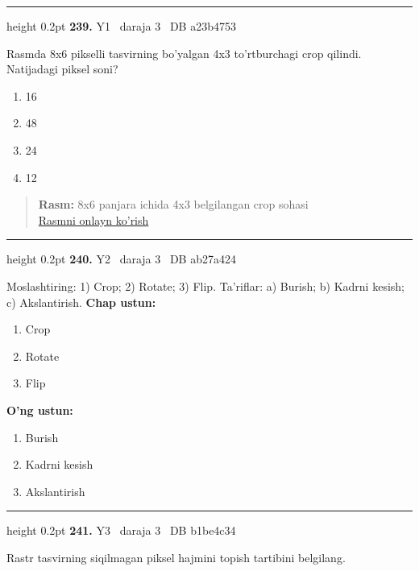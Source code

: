 \documentclass[10pt,a4paper,oneside]{article}
\begin{document}
\vspace{2mm}\hrule height 0.2pt \vspace{4mm}
\hypertarget{q239}{\textbf{\color{ink}239.}}  {\color{muted}\scriptsize Y1 \textbullet\ daraja 3 \textbullet\ DB a23b4753}
\par
Rasmda 8x6 pikselli tasvirning bo'yalgan 4x3 to'rtburchagi crop qilindi. Natijadagi piksel soni?
\begin{enumerate}[label=\Alph*),leftmargin=9mm]
\item 16
\item 48
\item 24
\item 12
\end{enumerate}
\begin{quote}\footnotesize\color{muted}\textbf{Rasm:} 8x6 panjara ichida 4x3 belgilangan crop sohasi\\
\href{https://github.com/sarvar9417/attestatsiya/blob/main/public/graphics-web-v2/crop_grid.svg}{Rasmni onlayn ko'rish}
\end{quote}
\vspace{2mm}\hrule height 0.2pt \vspace{4mm}
\hypertarget{q240}{\textbf{\color{ink}240.}}  {\color{muted}\scriptsize Y2 \textbullet\ daraja 3 \textbullet\ DB ab27a424}
\par
Moslashtiring: 1) Crop; 2) Rotate; 3) Flip. Ta'riflar: a) Burish; b) Kadrni kesish; c) Akslantirish.
\textbf{\footnotesize Chap ustun:}
\begin{enumerate}[label=\arabic*),leftmargin=9mm]
\item Crop
\item Rotate
\item Flip
\end{enumerate}
\textbf{\footnotesize O'ng ustun:}
\begin{enumerate}[label=\Alph*),leftmargin=9mm]
\item Burish
\item Kadrni kesish
\item Akslantirish
\end{enumerate}
\vspace{2mm}\hrule height 0.2pt \vspace{4mm}
\hypertarget{q241}{\textbf{\color{ink}241.}}  {\color{muted}\scriptsize Y3 \textbullet\ daraja 3 \textbullet\ DB b1be4c34}
\par
Rastr tasvirning siqilmagan piksel hajmini topish tartibini belgilang.
\end{document}
